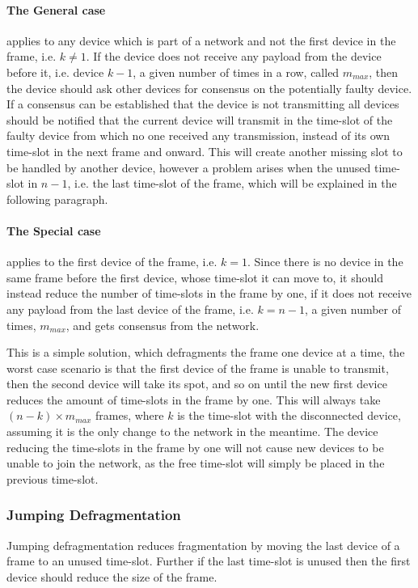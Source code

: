 \paragraph{The General case}applies to any device which is part of a network and not the first device in the frame, i.e. $k \neq 1$.
If the device does not receive any payload from the device before it, i.e. device $k - 1$, a given number of times in a row, called $m_{max}$, then the device should ask other devices for consensus on the potentially faulty device.
If a consensus can be established that the device is not transmitting all devices should be notified that the current device will transmit in the time-slot of the faulty device from which no one received any transmission, instead of its own time-slot in the next frame and onward. 
This will create another missing slot to be handled by another device, however a problem arises when the unused time-slot in $n - 1$, i.e. the last time-slot of the frame, which will be explained in the following paragraph.

\paragraph{The Special case}applies to the first device of the frame, i.e. $k = 1$. 
Since there is no device in the same frame before the first device, whose time-slot it can move to, it should instead reduce the number of time-slots in the frame by one, if it does not receive any payload from the last device of the frame, i.e. $k = n - 1$, a given number of times, $m_{max}$, and gets consensus from the network. 


\bigskip \noindent
This is a simple solution, which defragments the frame one device at a time, the worst case scenario is that the first device of the frame is unable to transmit, then the second device will take its spot, and so on until the new first device reduces the amount of time-slots in the frame by one. 
This will always take $(n - k) \times m_{max}$ frames, where $k$ is the time-slot with the disconnected device, assuming it is the only change to the network in the meantime. 
The device reducing the time-slots in the frame by one will not cause new devices to be unable to join the network, as the free time-slot will simply be placed in the previous time-slot. 

\subsubsection{Jumping Defragmentation}
Jumping defragmentation reduces fragmentation by moving the last device of a frame to an unused time-slot. Further if the last time-slot is unused then the first device should reduce the size of the frame.

